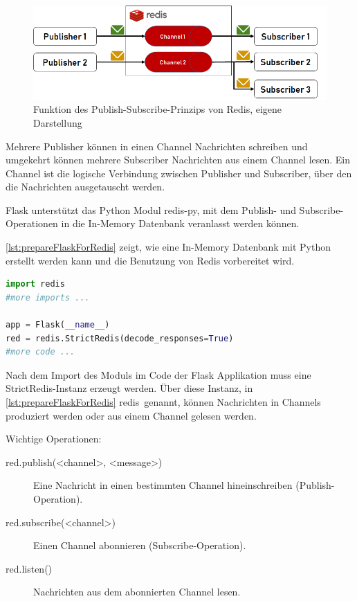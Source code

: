 \documentclass[a4paper,titlepage,halfparskip,12pt]{scrreprt}
\begin{document}
\begin{onehalfspacing}
\begin{figure}[h]
	\centering
	\includegraphics[width=\textwidth]{images/RedisFunction}
	\caption{Funktion des Publish-Subscribe-Prinzips von Redis, eigene Darstellung}
	\label{img:RedisFunction}
\end{figure}

Mehrere Publisher können in einen Channel Nachrichten schreiben und umgekehrt können mehrere Subscriber Nachrichten aus einem Channel lesen. Ein Channel ist die logische Verbindung zwischen Publisher und Subscriber, über den die Nachrichten ausgetauscht werden.\cite{redisDocumentation}

Flask unterstützt das Python Modul redis-py, mit dem Publish- und Subscribe-Operationen in die In-Memory Datenbank veranlasst werden können.

\autoref{lst:prepareFlaskForRedis} zeigt, wie eine In-Memory Datenbank mit Python erstellt werden kann und die Benutzung von Redis vorbereitet wird.

\begin{lstlisting}[language=python, caption={Code für die Einbindung von Redis in die Flask Applikation}, label={lst:prepareFlaskForRedis}]
import redis
#more imports ...

app = Flask(__name__)
red = redis.StrictRedis(decode_responses=True)
#more code ...
\end{lstlisting}

Nach dem Import des Moduls im Code der Flask Applikation muss eine StrictRedis-Instanz erzeugt werden. Über diese Instanz, in \autoref{lst:prepareFlaskForRedis} \glqq redis\grqq\ genannt, können Nachrichten in Channels produziert werden oder aus einem Channel gelesen werden.

\pagebreak

Wichtige Operationen:

\begin{description}
\item[red.publish(<channel>, <message>)] Eine Nachricht in einen bestimmten Channel hineinschreiben (Publish-Operation).
\item[red.subscribe(<channel>)] Einen Channel abonnieren (Subscribe-Operation).
\item[red.listen()] Nachrichten aus dem abonnierten Channel lesen.
\end{description}


\end{onehalfspacing}
\end{document}
